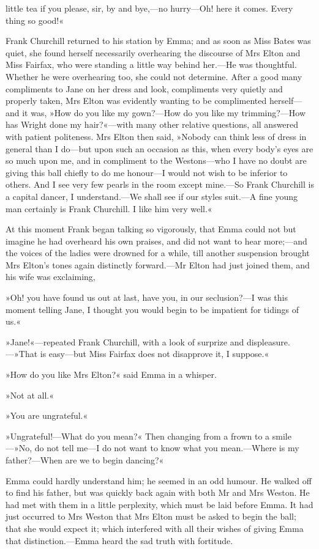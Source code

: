 little tea if you please, sir, by and bye,—no hurry—Oh! here it comes. Every thing so good!«

Frank Churchill returned to his station by Emma; and as soon as Miss Bates was quiet, she found herself necessarily overhearing the discourse of Mrs Elton and Miss Fairfax, who were standing a little way behind her.—He was thoughtful. Whether he were overhearing too, she could not determine. After a good many compliments to Jane on her dress and look, compliments very quietly and properly taken, Mrs Elton was evidently wanting to be complimented herself—and it was, »How do you like my gown?—How do you like my trimming?—How has Wright done my hair?«—with many other relative questions, all answered with patient politeness. Mrs Elton then said, »Nobody can think less of dress in general than I do—but upon such an occasion as this, when every body's eyes are so much upon me, and in compliment to the Westons—who I have no doubt are giving this ball chiefly to do me honour—I would not wish to be inferior to others. And I see very few pearls in the room except mine.—So Frank Churchill is a capital dancer, I understand.—We shall see if our styles suit.—A fine young man certainly is Frank Churchill. I like him very well.«



At this moment Frank began talking so vigorously, that Emma could not but imagine he had overheard his own praises, and did not want to hear more;—and the voices of the ladies were drowned for a while, till another suspension brought Mrs Elton's tones again distinctly forward.—Mr Elton had just joined them, and his wife was exclaiming,

»Oh! you have found us out at last, have you, in our seclusion?—I was this moment telling Jane, I thought you would begin to be impatient for tidings of us.«

»Jane!«—repeated Frank Churchill, with a look of surprize and displeasure.—»That is easy—but Miss Fairfax does not disapprove it, I suppose.«

»How do you like Mrs Elton?« said Emma in a whisper.

»Not at all.«

»You are ungrateful.«

»Ungrateful!—What do you mean?« Then changing from a frown to a smile—»No, do not tell me—I do not want to know what you mean.—Where is my father?—When are we to begin dancing?«

Emma could hardly understand him; he seemed in an odd humour. He walked off to find his father, but was quickly back again with both Mr and Mrs Weston. He had met with them in a little perplexity, which must be laid before Emma. It had just occurred to Mrs Weston that Mrs Elton must be asked to begin the ball; that she would expect it; which interfered with all their wishes of giving Emma that distinction.—Emma heard the sad truth with fortitude.

